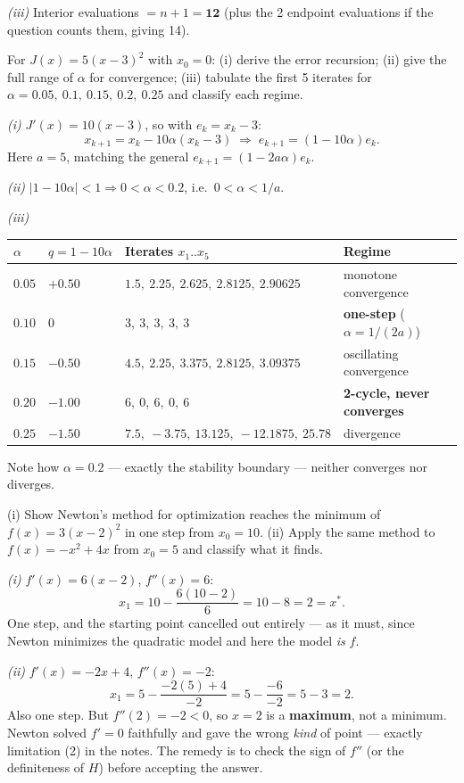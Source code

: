 \begin{probbox}
\emph{(iii)} Interior evaluations $= n+1 = \mathbf{12}$ (plus the 2 endpoint evaluations if the question counts them, giving 14).

 For $J(x) = 5(x-3)^2$ with $x_0 = 0$: (i) derive the error recursion; (ii) give the full range of $\alpha$ for convergence; (iii) tabulate the first 5 iterates for $\alpha = 0.05,\ 0.1,\ 0.15,\ 0.2,\ 0.25$ and classify each regime.

\ans \emph{(i)} $J'(x) = 10(x-3)$, so with $e_k = x_k - 3$:
\[
x_{k+1} = x_k - 10\alpha(x_k-3) \;\Longrightarrow\; e_{k+1} = (1-10\alpha)e_k .
\]
Here $a = 5$, matching the general $e_{k+1} = (1-2a\alpha)e_k$.

\emph{(ii)} $|1-10\alpha| < 1 \Rightarrow 0 < \alpha < 0.2$, i.e.\ $0<\alpha<1/a$.

\emph{(iii)}
\begin{center}\small
\begin{tabular}{@{}llll@{}}
\toprule
$\alpha$ & $q = 1-10\alpha$ & Iterates $x_1..x_5$ & Regime\\
\midrule
$0.05$ & $+0.50$ & $1.5,\ 2.25,\ 2.625,\ 2.8125,\ 2.90625$ & monotone convergence\\
$0.10$ & $0$ & $3,\ 3,\ 3,\ 3,\ 3$ & \textbf{one-step} ($\alpha = 1/(2a)$)\\
$0.15$ & $-0.50$ & $4.5,\ 2.25,\ 3.375,\ 2.8125,\ 3.09375$ & oscillating convergence\\
$0.20$ & $-1.00$ & $6,\ 0,\ 6,\ 0,\ 6$ & \textbf{2-cycle, never converges}\\
$0.25$ & $-1.50$ & $7.5,\ -3.75,\ 13.125,\ -12.1875,\ 25.78$ & divergence\\
\bottomrule
\end{tabular}
\end{center}
Note how $\alpha = 0.2$ --- exactly the stability boundary --- neither converges nor diverges.

 (i) Show Newton's method for optimization reaches the minimum of $f(x) = 3(x-2)^2$ in one step from $x_0 = 10$. (ii) Apply the same method to $f(x) = -x^2+4x$ from $x_0 = 5$ and classify what it finds.

\ans \emph{(i)} $f'(x) = 6(x-2)$, $f''(x) = 6$:
\[
x_1 = 10 - \frac{6(10-2)}{6} = 10-8 = 2 = x^\ast .
\]
One step, and the starting point cancelled out entirely --- as it must, since Newton minimizes the quadratic model and here the model \emph{is} $f$.

\emph{(ii)} $f'(x) = -2x+4$, $f''(x) = -2$:
\[
x_1 = 5 - \frac{-2(5)+4}{-2} = 5 - \frac{-6}{-2} = 5-3 = 2 .
\]
Also one step. But $f''(2) = -2 < 0$, so $x=2$ is a \textbf{maximum}, not a minimum. Newton solved $f'=0$ faithfully and gave the wrong \emph{kind} of point --- exactly limitation (2) in the notes. The remedy is to check the sign of $f''$ (or the definiteness of $H$) before accepting the answer.


\end{probbox}
